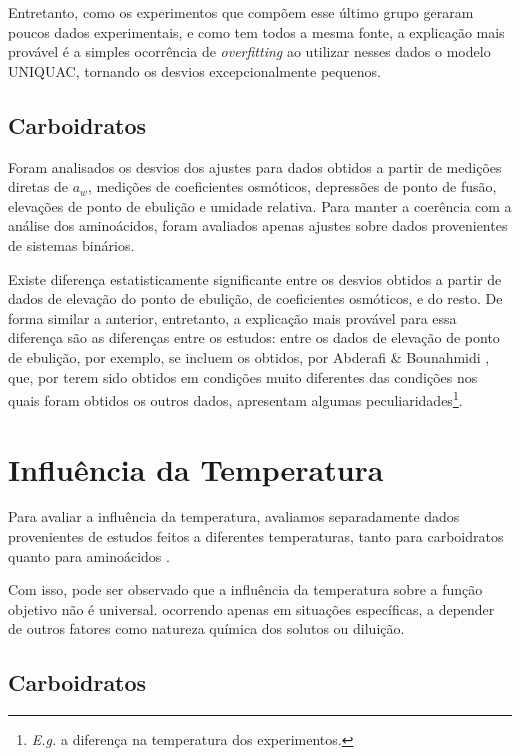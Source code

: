 \documentclass[
	12pt,				%
	openright,
	twoside,
	a4paper,			%
	english,			%
	french,				%
	spanish,			%
	brazil				%
	]{abntex2}
\begin{document}
Entretanto, como os experimentos que compõem esse último grupo geraram poucos
dados experimentais, e como tem todos a mesma fonte, a explicação mais provável
é a simples ocorrência de \textit{overfitting} ao utilizar nesses dados o modelo
UNIQUAC, tornando os desvios excepcionalmente pequenos.

\subsection{Carboidratos}

Foram analisados os desvios dos ajustes para dados obtidos a partir de medições
diretas de $a_w$, medições de coeficientes osmóticos, depressões de ponto de fusão,
elevações de ponto de ebulição e umidade relativa. Para manter a coerência com a
análise dos aminoácidos, foram avaliados apenas ajustes sobre dados provenientes de
sistemas binários.

Existe diferença estatisticamente significante entre os desvios obtidos a partir
de dados de elevação do ponto de ebulição, de coeficientes osmóticos, e do resto.
De forma similar a anterior, entretanto, a explicação mais provável para essa
diferença são as diferenças entre os estudos: entre os dados de elevação de ponto
de ebulição, por exemplo, se incluem os obtidos, por Abderafi \& Bounahmidi
\cite{abderafi1994}, que, por terem sido obtidos em condições muito diferentes
das condições nos quais foram obtidos os outros dados, apresentam algumas
peculiaridades\footnote{%
	\textit{E.g.} a diferença na temperatura dos experimentos.
}.


\section{Influência da Temperatura}

Para avaliar a influência da temperatura, avaliamos separadamente dados
provenientes de estudos feitos a diferentes temperaturas, tanto para carboidratos
\cite{velezmoro2000} quanto para aminoácidos \cite{romero2006,tsurko2007}.

Com isso, pode ser observado que a influência da temperatura sobre a função
objetivo não é universal. ocorrendo apenas em situações específicas, a
depender de outros fatores como natureza química dos solutos ou diluição.

\subsection{Carboidratos}
\end{document}
